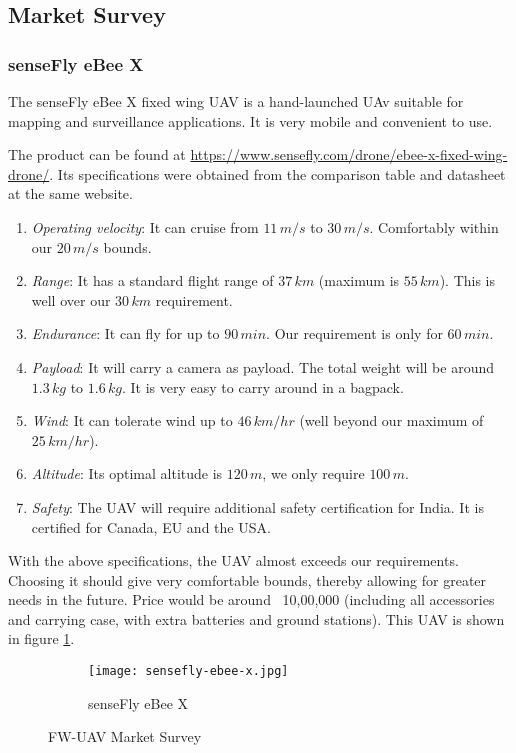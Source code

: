\subsection{Market Survey}

\subsubsection*{senseFly eBee X}

The senseFly eBee X fixed wing UAV is a hand-launched UAv suitable for mapping and surveillance applications. It is very mobile and convenient to use. 

The product can be found at \url{https://www.sensefly.com/drone/ebee-x-fixed-wing-drone/}. Its specifications were obtained from the comparison table and datasheet at the same website.

\begin{enumerate}
    \item \textit{Operating velocity}: It can cruise from $11\,m/s$ to $30\,m/s$. Comfortably within our $20\,m/s$ bounds.
    \item \textit{Range}: It has a standard flight range of $37\,km$ (maximum is $55\,km$). This is well over our $30\,km$ requirement.
    \item \textit{Endurance}: It can fly for up to $90\,min$. Our requirement is only for $60\,min$.
    \item \textit{Payload}: It will carry a camera as payload. The total weight will be around $1.3\,kg$ to $1.6\,kg$. It is very easy to carry around in a bagpack.
    \item \textit{Wind}: It can tolerate wind up to $46\,km/hr$ (well beyond our maximum of $25\,km/hr$).
    \item \textit{Altitude}: Its optimal altitude is $120\,m$, we only require $100\,m$.
    \item \textit{Safety}: The UAV will require additional safety certification for India. It is certified for Canada, EU and the USA.
\end{enumerate}

With the above specifications, the UAV almost exceeds our requirements. Choosing it should give very comfortable bounds, thereby allowing for greater needs in the future.
Price would be around \rupee~10,00,000 (including all accessories and carrying case, with extra batteries and ground stations). This UAV is shown in figure \ref{fig:ms-sf-ebee-x}.

\begin{figure}[ht]
    \centering
    \begin{subfigure}[b]{0.45\textwidth}
        \texttt{[image: sensefly-ebee-x.jpg]}
        \caption{senseFly eBee X}
        \label{fig:ms-sf-ebee-x}
    \end{subfigure}
    \caption{FW-UAV Market Survey}
    \label{fig:market-survey-fwuavs}
\end{figure}
